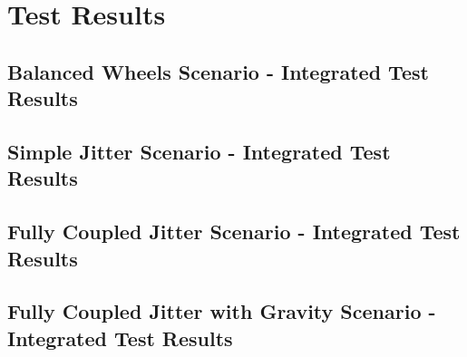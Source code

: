 \clearpage

\section{Test Results}

\subsection{Balanced Wheels Scenario - Integrated Test Results}






\clearpage

\subsection{Simple Jitter Scenario - Integrated Test Results}






\clearpage

\subsection{Fully Coupled Jitter Scenario - Integrated Test Results}






\clearpage

\subsection{Fully Coupled Jitter with Gravity Scenario - Integrated Test Results}






